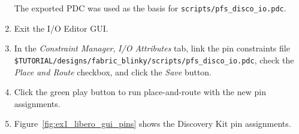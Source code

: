 \begin{enumerate}
The exported PDC was used as the basis for \verb+scripts/pfs_disco_io.pdc+.
\item Exit the I/O Editor GUI.
\item In the \emph{Constraint Manager}, \emph{I/O Attributes} tab, link the
pin constraints file\newline
\verb+$TUTORIAL/designs/fabric_blinky/scripts/pfs_disco_io.pdc+,\newline %
check the  \emph{Place and Route} checkbox, and click the \emph{Save} button.

\item Click the green play button to run place-and-route with the new pin assignments.

\item Figure~\ref{fig:ex1_libero_gui_pins} shows the Discovery Kit pin
assignments.

\end{enumerate}

\vskip5mm
\begin{center}
\end{center}

